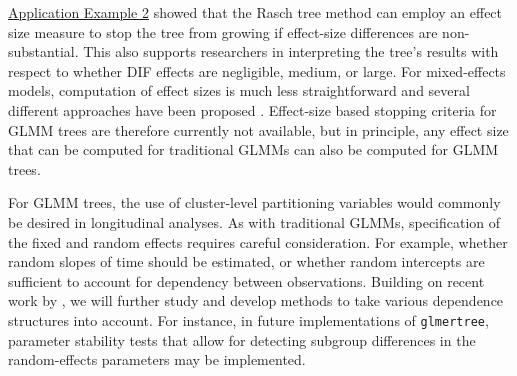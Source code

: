 \documentclass[doc,floatsintext,natbib]{apa7}
\begin{document}
\hyperref[sec:TutorialRasch]{Application Example 2} showed that the Rasch tree method can employ an effect size measure to stop the tree from growing if effect-size differences are non-substantial. This also supports researchers in interpreting the tree's results with respect to whether DIF effects are negligible, medium, or large. For mixed-effects models, computation of effect sizes is much less straightforward and several different approaches have been proposed \citep[e.g., ][]{JuddyWest17, BrysyStev18, Bran18}. Effect-size based stopping criteria for GLMM trees are therefore currently not available, but in principle, any effect size that can be computed for traditional GLMMs can also be computed for GLMM trees.



For GLMM trees, the use of cluster-level partitioning variables would commonly be desired in longitudinal analyses. As with traditional GLMMs, specification of the fixed and random effects requires careful consideration. For example, whether random slopes of time should be estimated, or whether random intercepts are sufficient to account for dependency between observations. Building on recent work by \citet{FokkyZeil24}, we will further study and develop methods to take various dependence structures into account. For instance, in future implementations of \texttt{glmertree}, parameter stability tests that allow for detecting subgroup differences in the random-effects parameters \citep{Wang2021a} may be implemented.

\end{document}
